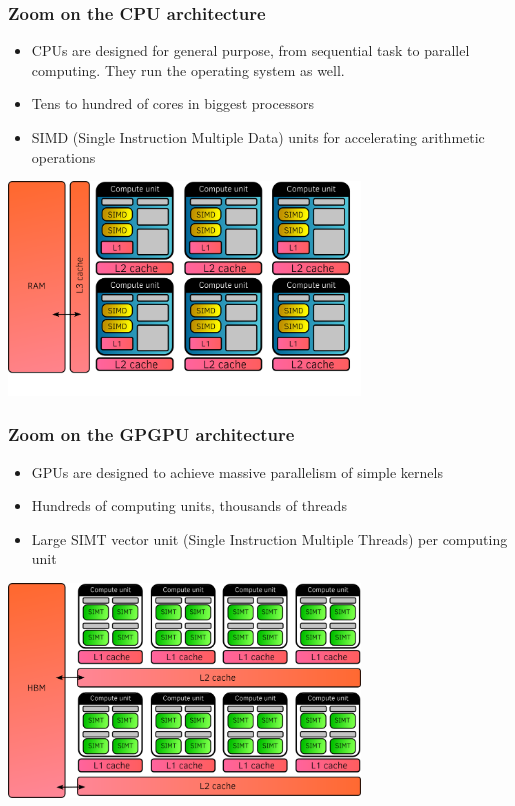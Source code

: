 \documentclass[aspectratio=169]{beamer}
\begin{document}
\begin{frame}
    \frametitle{Zoom on the CPU architecture}

    \small
    \begin{itemize}
        \item CPUs are designed for general purpose, from sequential task to parallel computing. They run the operating system as well.
        \item Tens to hundred of cores in biggest processors
        \item SIMD (Single Instruction Multiple Data) units for accelerating arithmetic operations
    \end{itemize}
    
    \begin{center}
        \includegraphics[width=0.7\textwidth]{../../images/cpu_architecture.png}
    \end{center}
    
\end{frame}



\begin{frame}
    \frametitle{Zoom on the GPGPU architecture}

\small
\begin{itemize}
    \item GPUs are designed to achieve massive parallelism of simple kernels
    \item Hundreds of computing units, thousands of threads
    \item Large SIMT vector unit (Single Instruction Multiple Threads) per computing unit
\end{itemize}

\begin{center}
    \includegraphics[width=0.7\textwidth]{../../images/gpu_architecture.png}
\end{center}

\end{frame}
\end{document}
